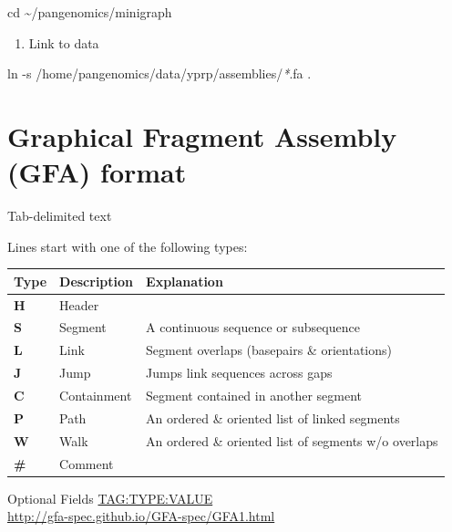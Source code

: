 \documentclass[
]{book}
\newenvironment{Shaded}{\begin{snugshade}}{\end{snugshade}}
\newcommand{\AttributeTok}[1]{\textcolor[rgb]{0.77,0.63,0.00}{#1}}
\newcommand{\BuiltInTok}[1]{#1}
\newcommand{\FunctionTok}[1]{\textcolor[rgb]{0.00,0.00,0.00}{#1}}
\newcommand{\NormalTok}[1]{#1}
\newcommand{\PreprocessorTok}[1]{\textcolor[rgb]{0.56,0.35,0.01}{\textit{#1}}}
\providecommand{\tightlist}{%
  \setlength{\itemsep}{0pt}\setlength{\parskip}{0pt}}
\begin{document}
\begin{Shaded}
\begin{Highlighting}[]
\BuiltInTok{cd}\NormalTok{ \textasciitilde{}/pangenomics/minigraph}
\end{Highlighting}
\end{Shaded}

\begin{enumerate}
\def\labelenumi{\arabic{enumi}.}
\setcounter{enumi}{3}
\tightlist
\item
  Link to data
\end{enumerate}

\begin{Shaded}
\begin{Highlighting}[]
\FunctionTok{ln} \AttributeTok{{-}s}\NormalTok{ /home/pangenomics/data/yprp/assemblies/}\PreprocessorTok{*}\NormalTok{.fa .}
\end{Highlighting}
\end{Shaded}

\hypertarget{graphical-fragment-assembly-gfa-format}{%
\section{Graphical Fragment Assembly (GFA) format}\label{graphical-fragment-assembly-gfa-format}}

Tab-delimited text

Lines start with one of the following types:

\begin{longtable}[]{@{}lll@{}}
\toprule()
Type & Description & Explanation \\
\midrule()
\endhead
\textbf{H} & Header & \\
\textbf{S} & Segment & A continuous sequence or subsequence \\
\textbf{L} & Link & Segment overlaps (basepairs \& orientations) \\
\textbf{J} & Jump & Jumps link sequences across gaps \\
\textbf{C} & Containment & Segment contained in another segment \\
\textbf{P} & Path & An ordered \& oriented list of linked segments \\
\textbf{W} & Walk & An ordered \& oriented list of segments w/o overlaps \\
\textbf{\#} & Comment & \\
\bottomrule()
\end{longtable}

Optional Fields \url{TAG:TYPE:VALUE}\\
\url{http://gfa-spec.github.io/GFA-spec/GFA1.html}
\end{document}
